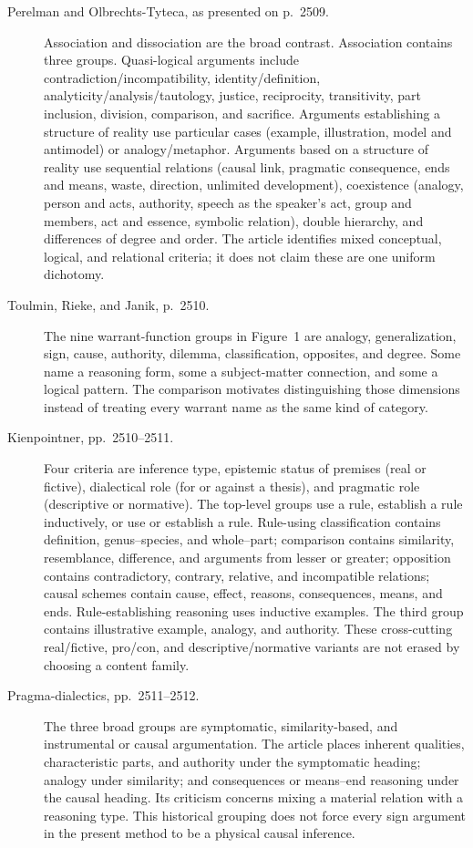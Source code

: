 \begin{description}
\item[Perelman and Olbrechts-Tyteca, as presented on p.~2509.]
Association and dissociation are the broad contrast.
Association contains three groups.
Quasi-logical arguments include contradiction/incompatibility,
identity/definition, analyticity/analysis/tautology, justice,
reciprocity, transitivity, part inclusion, division, comparison,
and sacrifice.
Arguments establishing a structure of reality use particular cases
(example, illustration, model and antimodel) or analogy/metaphor.
Arguments based on a structure of reality use sequential relations
(causal link, pragmatic consequence, ends and means, waste,
direction, unlimited development), coexistence (analogy, person
and acts, authority, speech as the speaker's act, group and members,
act and essence, symbolic relation), double hierarchy, and
differences of degree and order.
The article identifies mixed conceptual, logical, and relational
criteria; it does not claim these are one uniform dichotomy.

\item[Toulmin, Rieke, and Janik, p.~2510.]
The nine warrant-function groups in Figure~1 are analogy,
generalization, sign, cause, authority, dilemma, classification,
opposites, and degree. Some name a reasoning form, some a
subject-matter connection, and some a logical pattern.
The comparison motivates distinguishing those dimensions instead
of treating every warrant name as the same kind of category.

\item[Kienpointner, pp.~2510--2511.]
Four criteria are inference type, epistemic status of premises
(real or fictive), dialectical role (for or against a thesis),
and pragmatic role (descriptive or normative).
The top-level groups use a rule, establish a rule inductively,
or use or establish a rule.
Rule-using classification contains definition, genus--species,
and whole--part; comparison contains similarity, resemblance,
difference, and arguments from lesser or greater;
opposition contains contradictory, contrary, relative, and
incompatible relations; causal schemes contain cause, effect,
reasons, consequences, means, and ends.
Rule-establishing reasoning uses inductive examples.
The third group contains illustrative example, analogy, and authority.
These cross-cutting real/fictive, pro/con, and descriptive/normative
variants are not erased by choosing a content family.

\item[Pragma-dialectics, pp.~2511--2512.]
The three broad groups are symptomatic, similarity-based, and
instrumental or causal argumentation. The article places inherent
qualities, characteristic parts, and authority under the symptomatic
heading; analogy under similarity; and consequences or means--end
reasoning under the causal heading. Its criticism concerns mixing
a material relation with a reasoning type.
This historical grouping does not force every sign argument in
the present method to be a physical causal inference.


\end{description}
